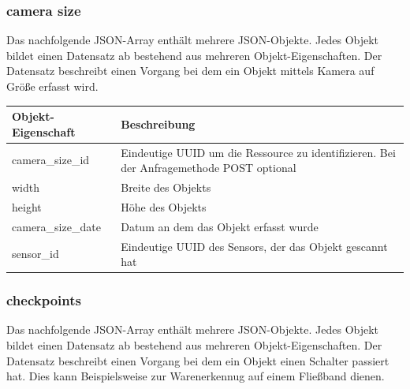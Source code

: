 \subsubsection{camera size}%
\label{sec:rest.json.camera_size}
Das nachfolgende JSON-Array enthält mehrere JSON-Objekte. Jedes Objekt bildet einen Datensatz ab bestehend aus mehreren Objekt-Eigenschaften. Der Datensatz beschreibt einen Vorgang bei dem ein Objekt mittels Kamera auf Größe erfasst wird.

\begin{jsoncode}
\end{jsoncode}

\begin{table}[H]
  \begin{tabularx}{\textwidth}{lX}
    \textbf{Objekt-Eigenschaft} & \textbf{Beschreibung}                                                                     \\ \toprule
    camera\_size\_id            & Eindeutige UUID um die Ressource zu identifizieren. Bei der Anfragemethode POST optional  \\
    width                       & Breite des Objekts                                                                        \\
    height                      & Höhe des Objekts                                                                          \\
    camera\_size\_date          & Datum an dem das Objekt erfasst wurde                                                     \\
    sensor\_id                  & Eindeutige UUID des Sensors, der das Objekt gescannt hat                                  \\
  \end{tabularx}
\end{table}

\subsubsection{checkpoints}%
\label{sec:rest.json.checkpoints}
Das nachfolgende JSON-Array enthält mehrere JSON-Objekte. Jedes Objekt bildet einen Datensatz ab bestehend aus mehreren Objekt-Eigenschaften. Der Datensatz beschreibt einen Vorgang bei dem ein Objekt einen Schalter passiert hat. Dies kann Beispielsweise zur Warenerkennug auf einem Fließband dienen.

